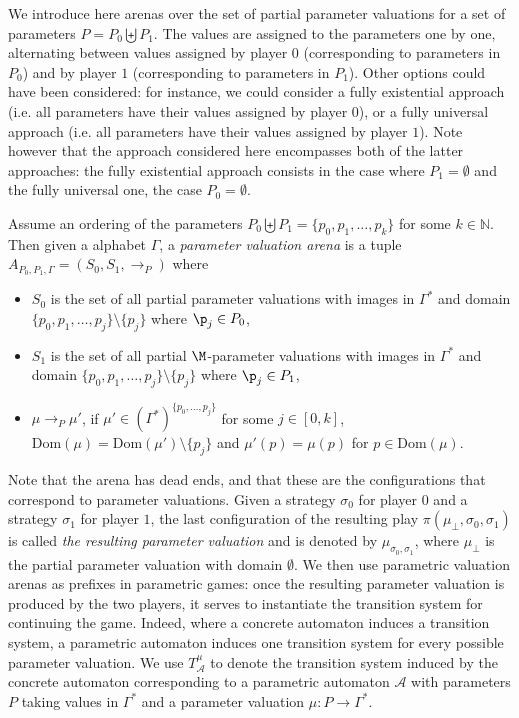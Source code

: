 \documentclass[a4paper,UKenglish,cleveref, autoref, thm-restate]{lipics-v2021}
\renewcommand{\A}{\mathcal{A}}
\newcommand{\N}{\mathbb{N}}
\begin{document}
We introduce here arenas over the set of partial parameter valuations for a set of parameters
$P = P_0 \biguplus P_1$. The values are assigned to the parameters one by one, alternating between values assigned by player $0$ (corresponding to parameters in $P_0$) and by player $1$ (corresponding to parameters in $P_1$). Other options could have been considered: for instance, we could consider a fully existential approach 
(i.e. all parameters have their values assigned by player $0$), 
or a fully universal approach
(i.e. all parameters have their values assigned by player $1$). 
Note however that the approach considered here encompasses both of the latter approaches:
the fully existential approach consists in the case where $P_1 = \emptyset$ and
the fully universal one, the case $P_0 = \emptyset$.



Assume an ordering of the parameters $P_0 \biguplus P_1 = \{p_0, p_1, \ldots, p_k \}$ for some 
 $k \in \N$.
%
Then given a alphabet $\Gamma$, a {\em parameter valuation arena} is a tuple $A_{P_0,P_1,\Gamma} = (S_0, S_1, \rightarrow_P)$ where
\begin{itemize}

\item $S_0$ is the set of all partial parameter valuations with images in $\Gamma^*$ and domain $\{p_0, p_1, \ldots, p_{j}\} \setminus \{p_j\}$ where $\p_j \in P_0$,

\item $S_1$ is the set of all partial $\M$-parameter valuations  with images in $\Gamma^*$ and  domain $\{p_0, p_1, \ldots, p_{j}\} \setminus \{p_j\}$ where $\p_j \in P_1$,

\item
$ \mu \rightarrow_P \mu'$,
if $\mu' \in (\Gamma^*)^{\{p_0, \ldots, p_j\}}$ for some $j \in [0,k]$,
$\text{Dom}(\mu) = \text{Dom}(\mu') \setminus \{p_j\}$
and
 $\mu'(p) = \mu(p)$ for $p \in \text{Dom}(\mu)$. \label{parametric arena}
\end{itemize}


Note that the arena has dead ends, and that these are the configurations that correspond to parameter valuations.
Given a strategy $\sigma_0$ for player $0$ and a strategy $\sigma_1 $ for player $1$,
the last configuration of the resulting play $\pi(\mu_\bot,\sigma_0, \sigma_1)$
is called {\em the resulting parameter valuation}
 and is denoted by $\mu_{\sigma_0, \sigma_1}$, where 
 $\mu_\bot$ is the partial parameter valuation with domain $\emptyset$. 
We then use parametric valuation arenas as prefixes in parametric games: once the resulting parameter valuation is produced by the two players, it serves to instantiate the transition system for continuing the game.
%
%
Indeed, where a concrete automaton induces a transition system, a parametric automaton induces one transition system for every possible parameter valuation.
We use $T^\mu_\A$ to denote the transition system induced by the concrete automaton corresponding to
a parametric automaton $\A$ with parameters $P$ taking values in $\Gamma^*$ and a parameter valuation $\mu: P \to \Gamma^*$.
\end{document}
